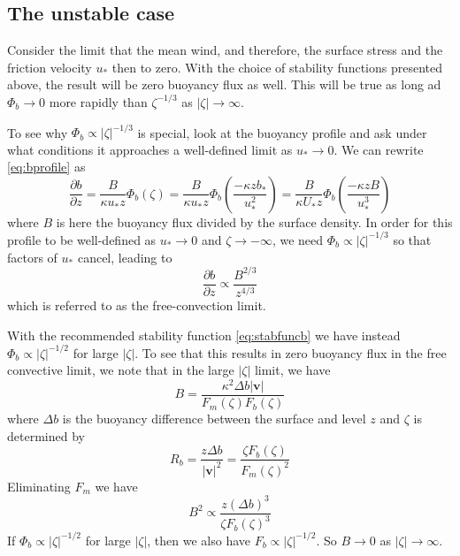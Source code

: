 \documentclass[12pt, letterpaper]{article}
\begin{document}
\subsection{The unstable case}

Consider the limit that the mean wind, and therefore, the surface
stress and the friction velocity $u_*$ then to zero.  With the choice
of stability functions presented above, the result will be zero
buoyancy flux as well.  This will be true as long ad $\Phi_b
\rightarrow 0$ more rapidly than $\zeta^{-1/3}$ as $ |\zeta| \rightarrow \infty $.

To see why $\Phi_b \propto |\zeta|^{-1/3}$ is special, look at the
buoyancy profile and ask under what conditions it approaches a
well-defined limit as $u_* \rightarrow 0$.  We can rewrite
\eqref{eq:bprofile} as
\begin{equation}
  \frac{\partial b}{\partial z} = \frac{B}{\kappa u_* z} \Phi_b(\zeta) =
  \frac{B}{\kappa u_* z} \Phi_b \left(\frac{-\kappa z b_*}{u_*^2}\right) =
  \frac{B}{\kappa U_* z} \Phi_b \left(\frac{-\kappa z B}{u_*^3}\right)
\end{equation}
where $B$ is here the buoyancy flux divided by the surface density.
In order for this profile to be well-defined as $u_* \rightarrow 0$
and $\zeta \rightarrow -\infty$, we need $\Phi_b \propto
|\zeta|^{-1/3}$ so that factors of $u_*$ cancel, leading to
\begin{equation}
  \frac{\partial b}{\partial z} \propto \frac{B^{2/3}}{z^{4/3}}
\end{equation}
which is referred to as the free-convection limit.

With the recommended stability function \eqref{eq:stabfuncb} we have
instead $\Phi_b \propto |\zeta|^{-1/2}$ for large $|\zeta|$.  To see that this results in zero buoyancy flux in the free convective limit, we note that in the large $|\zeta|$ limit, we have
\begin{equation}
  B = \frac{\kappa^2 \Delta b|\mathbf{v}|}{F_m(\zeta)F_b(\zeta)}
\end{equation}
where $\Delta b$ is the buoyancy difference between the surface and level $z$ and $\zeta$ is determined by
\begin{equation}
  R_b = \frac{z\Delta b}{|\mathbf{v}|^2} = \frac{\zeta F_b(\zeta)}{F_m(\zeta)^2}
\end{equation}
Eliminating $F_m$ we have
\begin{equation}
  B^2 \propto \frac{z(\Delta b)^3}{\zeta F_b(\zeta)^3}
\end{equation}
If $\Phi_b \propto |\zeta|^{-1/2}$ for large $|\zeta|$, then we also have $F_b \propto |\zeta|^{-1/2}$.  So $B \rightarrow 0$ as $|\zeta| \rightarrow \infty$.
\end{document}
